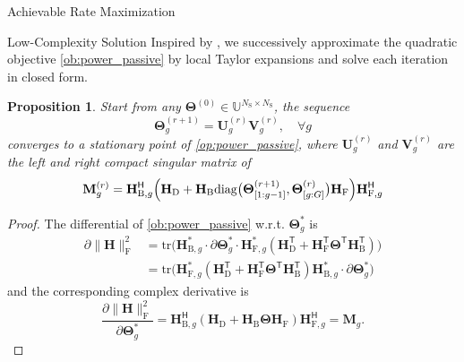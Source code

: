 \documentclass[journal]{IEEEtran}
\newtheorem{proposition}{Proposition}
\begin{document}
\begin{section}{Achievable Rate Maximization}
\begin{subsection}{Low-Complexity Solution}
		Inspired by \cite{Nie2017}, we successively approximate the quadratic objective \eqref{ob:power_passive} by local Taylor expansions and solve each iteration in closed form.

		\begin{proposition}\label{pp:power}
			Start from any $\mathbf{\Theta}^{(0)} \in \mathbb{U}^{N_\mathrm{S} \times N_\mathrm{S}}$, the sequence
			\begin{equation}
				\mathbf{\Theta}_g^{(r+1)} = \mathbf{U}_g^{(r)} \mathbf{V}_g^{(r)}, \quad \forall g
			\end{equation}
			converges to a stationary point of \eqref{op:power_passive}, where $\mathbf{U}_g^{(r)}$ and $\mathbf{V}_g^{(r)}$ are the left and right compact singular matrix of
			\begin{equation}
				\mathbf{M}_g^{(r)} = \mathbf{H}_{\mathrm{B},g}^\mathsf{H} \Bigl(\mathbf{H}_\mathrm{D} + \mathbf{H}_\mathrm{B} \mathrm{diag}\bigl(\mathbf{\Theta}_{[1:g-1]}^{(r+1)},\mathbf{\Theta}_{[g:G]}^{(r)}\bigr) \mathbf{H}_\mathrm{F}\Bigr) \mathbf{H}_{\mathrm{F},g}^\mathsf{H}
			\end{equation}
		\end{proposition}

		\begin{proof}
			The differential of \eqref{ob:power_passive} w.r.t. $\mathbf{\Theta}_g^*$ is
			\begin{align*}
				\partial \lVert \mathbf{H} \rVert _\mathrm{F}^2
				& = \mathrm{tr}\bigl(\mathbf{H}_{\mathrm{B},g}^* \cdot \partial \mathbf{\Theta}_g^* \cdot \mathbf{H}_{\mathrm{F},g}^* (\mathbf{H}_\mathrm{D}^\mathsf{T} + \mathbf{H}_\mathrm{F}^\mathsf{T} \mathbf{\Theta}^\mathsf{T} \mathbf{H}_\mathrm{B}^\mathsf{T})\bigr)\\
				& = \mathrm{tr}\bigl(\mathbf{H}_{\mathrm{F},g}^* (\mathbf{H}_\mathrm{D}^\mathsf{T} + \mathbf{H}_\mathrm{F}^\mathsf{T} \mathbf{\Theta}^\mathsf{T} \mathbf{H}_\mathrm{B}^\mathsf{T}) \mathbf{H}_{\mathrm{B},g}^* \cdot \partial \mathbf{\Theta}_g^*\bigr)
			\end{align*}
			and the corresponding complex derivative is
			\begin{equation}
				\frac{\partial \lVert \mathbf{H} \rVert _\mathrm{F}^2}{\partial \mathbf{\Theta}_g^*} = \mathbf{H}_{\mathrm{B},g}^\mathsf{H} (\mathbf{H}_\mathrm{D} + \mathbf{H}_\mathrm{B} \mathbf{\Theta} \mathbf{H}_\mathrm{F}) \mathbf{H}_{\mathrm{F},g}^\mathsf{H} = \mathbf{M}_g.
			\end{equation}


\end{proof}
\end{subsection}
\end{section}
\end{document}
